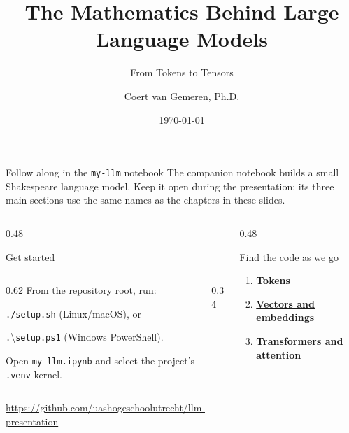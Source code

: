 \documentclass[aspectratio=169]{beamer}
\title[Mathematics Behind LLMs]{The Mathematics Behind Large Language Models}
\subtitle{From Tokens to Tensors}
\author[C.J. van Gemeren]{Coert van Gemeren, Ph.D.}
\institute[HU]{University of Applied Sciences Utrecht}
\date{\today}
\begin{document}
\begin{frame}
  \titlepage{}
\end{frame}

\begin{frame}{Follow along in the \texttt{my-llm} notebook}
  The companion notebook builds a small Shakespeare language model. Keep it
  open during the presentation: its three main sections use the same names as
  the chapters in these slides.

  \vspace{0.5em}
  \begin{columns}[T]
    \begin{column}{0.48\textwidth}
      \begin{block}{Get started}
        \begin{columns}[c,onlytextwidth]
          \begin{column}{0.62\linewidth}
            \footnotesize
            From the repository root, run:

            \smallskip
            \texttt{./setup.sh} (Linux/macOS), or

            \smallskip
            \texttt{.}\textbackslash\texttt{setup.ps1} (Windows PowerShell).

            \smallskip
            Open \texttt{my-llm.ipynb} and select the project's
            \texttt{.venv} kernel.
          \end{column}
          \begin{column}{0.34\linewidth}
            \centering
          \end{column}
        \end{columns}

        \medskip
        \centering
        \scriptsize
        \url{https://github.com/uashogeschoolutrecht/llm-presentation}
      \end{block}
    \end{column}
    \begin{column}{0.48\textwidth}
      \begin{block}{Find the code as we go}
        \begin{enumerate}
          \item \hyperlink{sec:tokens}{\textbf{Tokens}}
          \item \hyperlink{sec:embeddings}{\textbf{Vectors and embeddings}}
          \item \hyperlink{sec:attention}{\textbf{Transformers and attention}}
        \end{enumerate}


\end{block}
\end{column}
\end{columns}
\end{frame}
\end{document}
